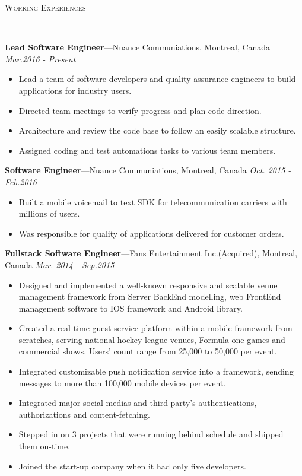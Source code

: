 \documentclass[11pt]{article}
\newenvironment{changemargin}[2]{%
  \begin{list}{}{%
    \setlength{\topsep}{0pt}%
    \setlength{\leftmargin}{#1}%
    \setlength{\rightmargin}{#2}%
    \setlength{\listparindent}{\parindent}%
    \setlength{\itemindent}{\parindent}%
    \setlength{\parsep}{\parskip}%
  }%
  \item[]}{\end{list}
}
\newcommand{\lineover}{
	\begin{changemargin}{-0.05in}{-0.05in}
		\vspace*{-8pt}
		\hrulefill \\
		\vspace*{-2pt}
	\end{changemargin}
}
\newcommand{\header}[1]{
	\begin{changemargin}{-0.5in}{-0.5in}
		\scshape{#1}\\
  	\lineover
	\end{changemargin}
}
\newenvironment{body} {
	\vspace*{-16pt}
	\begin{changemargin}{-0.25in}{-0.5in}
  }	
	{\end{changemargin}
}
\begin{document}
\header{Working Experiences}
\begin{body}
	\vspace{14pt}
	\textbf{Lead Software Engineer}---Nuance Communiations, Montreal, Canada  \hfill \emph{Mar.2016 - Present}\\
	\begin{itemize} \itemsep -0pt  %
		\item Lead a team of software developers and quality assurance engineers to build applications for industry users.
		\item Directed team meetings to verify progress and plan code direction.
		\item Architecture and review the code base to follow an easily scalable structure.
		\item Assigned coding and test automations tasks to various team members.
	\end{itemize}
	\vspace{14pt}
	\textbf{Software Engineer}---Nuance Communiations, Montreal, Canada  \hfill \emph{Oct. 2015 - Feb.2016}\\
	\begin{itemize} \itemsep -0pt  %
		\item Built a mobile voicemail to text SDK for telecommunication carriers with millions of users.
		\item Was responsible for quality of applications delivered for customer orders.
	\end{itemize}
	
	\vspace{14pt}
	\textbf{Fullstack Software Engineer}---Fans Entertainment Inc.(Acquired), Montreal, Canada  \hfill \emph{Mar. 2014 - Sep.2015}\\
	\begin{itemize} \itemsep -0pt  %
		\item Designed and implemented a well-known responsive and scalable venue management framework from Server BackEnd modelling, web FrontEnd management software to IOS framework and Android library.
		\item Created a real-time guest service platform within a mobile framework from scratches, serving national hockey league venues, Formula one games and commercial shows. Users' count range from 25,000 to 50,000 per event.
		\item Integrated customizable push notification service into a framework, sending messages to more than 100,000 mobile devices per event.
		\item Integrated major social medias and third-party's authentications, authorizations and content-fetching.
		\item Stepped in on 3 projects that were running behind schedule and shipped them on-time.
		\item Joined the start-up company when it had only five developers.
	\end{itemize}


\end{body}
\end{document}

